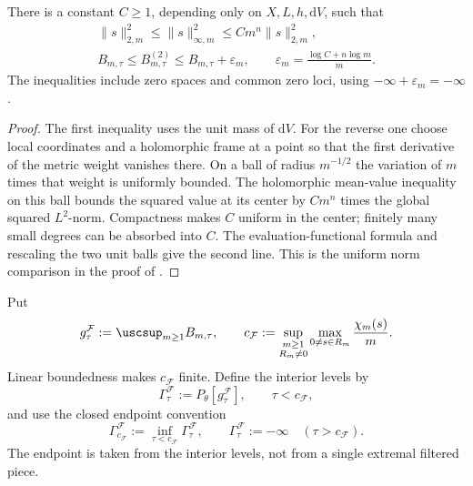\noindent\begin{minipage}{\linewidth}
\begin{lemma}\label{lem:rf-bergman-norm-comparison}
There is a constant $C\geq1$, depending only on $X,L,h,\mathrm dV$, such that
\[
 \begin{gathered}
 \|s\|_{2,m}^2\leq\|s\|_{\infty,m}^2
          \leq C m^n\|s\|_{2,m}^2,\\
 B_{m,\tau}\leq B^{(2)}_{m,\tau}
       \leq B_{m,\tau}+\varepsilon_m,
 \qquad \varepsilon_m=\frac{\log C+n\log m}{m}.
 \end{gathered}
\tag{65.14a}\label{eq:rf-bergman-norm-comparison}
\]
The inequalities include zero spaces and common zero loci, using $-\infty+\varepsilon_m=-\infty$.
\end{lemma}
\end{minipage}\par

\begin{proof}
The first inequality uses the unit mass of $\mathrm dV$. For the reverse one choose local coordinates and a holomorphic frame at a point so that the first derivative of the metric weight vanishes there. On a ball of radius $m^{-1/2}$ the variation of $m$ times that weight is uniformly bounded. The holomorphic mean-value inequality on this ball bounds the squared value at its center by $C m^n$ times the global squared $L^2$-norm. Compactness makes $C$ uniform in the center; finitely many small degrees can be absorbed into $C$. The evaluation-functional formula and rescaling the two unit balls give the second line. This is the uniform norm comparison in the proof of \cite[Lemmas~7.4 and~7.6]{RWN14}.
\end{proof}

Put
\[
 g_\tau^{\mathcal F}:=\uscsup_{m\geq1}B_{m,\tau},
 \qquad
 c_{\mathcal F}:=\sup_{\substack{m\geq1\\R_m\ne0}}
           \max_{0\ne s\in R_m}\frac{\chi_m(s)}m.
\]
Linear boundedness makes $c_{\mathcal F}$ finite. Define the interior levels by
\[
 \Gamma_\tau^{\mathcal F}:=P_\theta[g_\tau^{\mathcal F}],
                 \qquad \tau<c_{\mathcal F},
\tag{65.15}\label{eq:rf-filtration-test-curve}
\]
and use the closed endpoint convention
\[
 \Gamma_{c_{\mathcal F}}^{\mathcal F}
       :=\inf_{\tau<c_{\mathcal F}}\Gamma_\tau^{\mathcal F},
 \qquad
 \Gamma_\tau^{\mathcal F}:=-\infty\quad(\tau>c_{\mathcal F}).
\tag{65.15a}\label{eq:rf-filtration-closed-endpoint}
\]
The endpoint is taken from the interior levels, not from a single extremal filtered piece.


